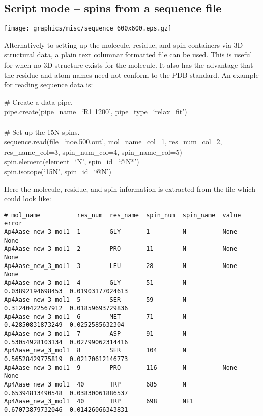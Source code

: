 
\subsection{Script mode -- spins from a sequence file} \label{sect: script - sequence file}

\begin{figure*}[h]
\texttt{[image: graphics/misc/sequence\_600x600.eps.gz]}
\end{figure*}

Alternatively to setting up the molecule, residue, and spin containers via 3D structural data, a plain text columnar formatted file can be used.  This is useful for when no 3D structure exists for the molecule.  It also has the advantage that the residue and atom names need not conform to the PDB standard.  An example for reading sequence data is:

\begin{exampleenv}
\# Create a data pipe. \\
pipe.create(pipe\_name=`R1 1200', pipe\_type=`relax\_fit') \\
 \\
\# Set up the 15N spins. \\
sequence.read(file=`noe.500.out', mol\_name\_col=1, res\_num\_col=2, res\_name\_col=3, spin\_num\_col=4, spin\_name\_col=5) \\
spin.element(element=`N', spin\_id=`@N*') \\
spin.isotope(`15N', spin\_id=`@N')
\end{exampleenv}

Here the molecule, residue, and spin information is extracted from the  file which could look like:

{\scriptsize \begin{verbatim}
# mol_name          res_num  res_name  spin_num  spin_name  value             error               
Ap4Aase_new_3_mol1  1        GLY       1         N          None              None                
Ap4Aase_new_3_mol1  2        PRO       11        N          None              None                
Ap4Aase_new_3_mol1  3        LEU       28        N          None              None                
Ap4Aase_new_3_mol1  4        GLY       51        N          0.03892194698453  0.01903177024613    
Ap4Aase_new_3_mol1  5        SER       59        N          0.31240422567912  0.01859693729836    
Ap4Aase_new_3_mol1  6        MET       71        N          0.42850831873249  0.0252585632304     
Ap4Aase_new_3_mol1  7        ASP       91        N          0.53054928103134  0.02799062314416    
Ap4Aase_new_3_mol1  8        SER       104       N          0.56528429775819  0.02170612146773    
Ap4Aase_new_3_mol1  9        PRO       116       N          None              None                
Ap4Aase_new_3_mol1  40       TRP       685       N          0.65394813490548  0.03830061886537    
Ap4Aase_new_3_mol1  40       TRP       698       NE1        0.67073879732046  0.01426066343831    
\end{verbatim}} \label{verb: noe.500.out}

